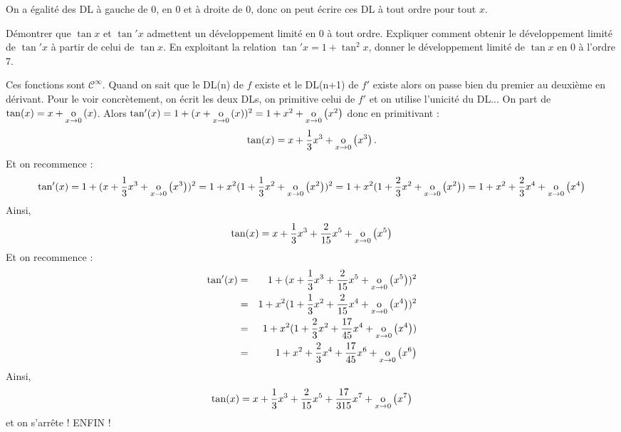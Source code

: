\documentclass{magnolia}
\begin{document}
\begin{sol}
On a égalité des DL à gauche de $0$, en $0$ et à droite de $0$, donc on peut écrire ces DL à tout ordre pour tout $x$.
\end{sol}

\begin{questions}
\question Démontrer que $\tan x$ et $\tan' x$ admettent un développement
  limité en $0$ à tout ordre. Expliquer comment obtenir le développement
  limité de $\tan'x$ à partir de celui de $\tan x$.
\question En exploitant la relation $\tan'x=1+\tan^2 x$, donner le
  développement limité de $\tan x$ en 0 à l'ordre 7.
\end{questions}

\begin{sol}
\begin{questions}
\question Ces fonctions sont $\mathcal{C}^{\infty}$.
 Quand on sait que le DL(n) de $f$ existe et le DL(n+1) de $f'$ existe alors on passe bien du premier au deuxième en dérivant. Pour le voir concrètement, on écrit les deux DLs, on primitive celui de $f'$ et on utilise l'unicité du DL...
\question On part de $\tan(x)=x+\underset{x \rightarrow 0}{\text{o}}\left(x\right)$. Alors $\tan'(x)=1+(x+\underset{x \rightarrow 0}{\text{o}}\left(x\right))^2=1+x^2+\underset{x \rightarrow 0}{\text{o}}\left(x^2\right)$ donc en primitivant :
$$\tan(x)=x+\dfrac{1}{3}x^3+\underset{x \rightarrow 0}{\text{o}}\left(x^3\right).$$
Et on recommence :
$$\tan'(x)=1+(x+\dfrac{1}{3}x^3+\underset{x \rightarrow 0}{\text{o}}\left(x^3\right))^2=1+x^2(1+\dfrac{1}{3}x^2+\underset{x \rightarrow 0}{\text{o}}\left(x^2\right))^2=1+x^2(1+\dfrac{2}{3}x^2+\underset{x \rightarrow 0}{\text{o}}\left(x^2\right))=1+x^2+\dfrac{2}{3}x^4+\underset{x \rightarrow 0}{\text{o}}\left(x^4\right)$$
Ainsi,
$$\tan(x)=x+\dfrac{1}{3}x^3+\dfrac{2}{15}x^5+\underset{x \rightarrow 0}{\text{o}}\left(x^5\right)$$
Et on recommence :
\begin{eqnarray*}
\tan'(x)&=& 1+(x+\dfrac{1}{3}x^3+\dfrac{2}{15}x^5+\underset{x \rightarrow 0}{\text{o}}\left(x^5\right))^2\\
&=& 1+x^2(1+\dfrac{1}{3}x^2+\dfrac{2}{15}x^4+\underset{x \rightarrow 0}{\text{o}}\left(x^4\right))^2\\
&=& 1+x^2(1+\dfrac{2}{3}x^2+\dfrac{17}{45}x^4+\underset{x \rightarrow 0}{\text{o}}\left(x^4\right))\\
&=& 1+x^2+\dfrac{2}{3}x^4+\dfrac{17}{45}x^6+\underset{x \rightarrow 0}{\text{o}}\left(x^6\right)
\end{eqnarray*}
Ainsi,
$$\tan(x)=x+\dfrac{1}{3}x^3+\dfrac{2}{15}x^5+\dfrac{17}{315}x^7+\underset{x \rightarrow 0}{\text{o}}\left(x^7\right)$$
et on s'arrête ! ENFIN !

\end{questions}



\end{sol}
\end{document}

